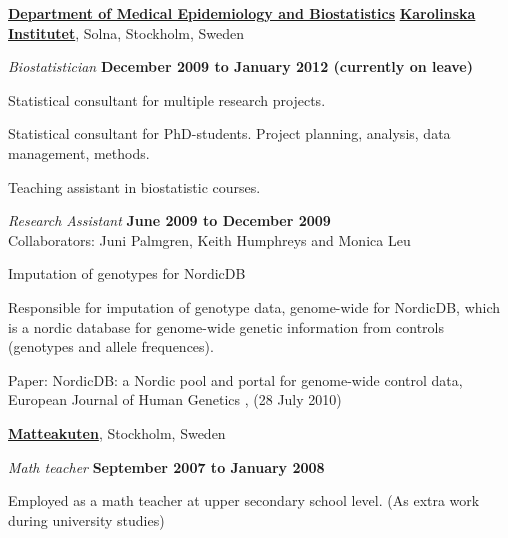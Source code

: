 \halfblankline


\href{http://ki.se/ki/jsp/polopoly.jsp?d=9600}{\textbf{Department of Medical Epidemiology and Biostatistics}}
\href{http://www.ki.se/}{\textbf{Karolinska Institutet}}, Solna, Stockholm, Sweden
\begin{outerlist}

\item[] \textit{Biostatistician}%
        \hfill \textbf{December 2009 to January 2012 (currently on leave)}
\begin{innerlist}
\item Statistical consultant for multiple research projects.
\item Statistical consultant for PhD-students. Project planning, analysis, data management, methods.
\item Teaching assistant in biostatistic courses.
\end{innerlist}

\item[] \textit{Research Assistant}%
        \hfill \textbf{June 2009 to December 2009}
\\ Collaborators: Juni Palmgren, Keith Humphreys and Monica Leu
\begin{innerlist}
  \item Imputation of genotypes for NordicDB
  \begin{innerlist}
    \item Responsible for imputation of genotype data, genome-wide for NordicDB, which is a nordic database for genome-wide genetic information from controls (genotypes and allele frequences).
    \item Paper: NordicDB: a Nordic pool and portal for genome-wide control data, European Journal of Human Genetics , (28 July 2010)
  \end{innerlist}
\end{innerlist}

\end{outerlist}

\halfblankline

\href{http://www.matteakuten.se}{\textbf{Matteakuten}}, Stockholm, Sweden
\begin{outerlist}

\item[] \textit{Math teacher}%
        \hfill \textbf{September 2007 to January 2008}
\begin{innerlist}
\item Employed as a math teacher at upper secondary school level. (As extra work during university studies) 
\end{innerlist}

\end{outerlist}

